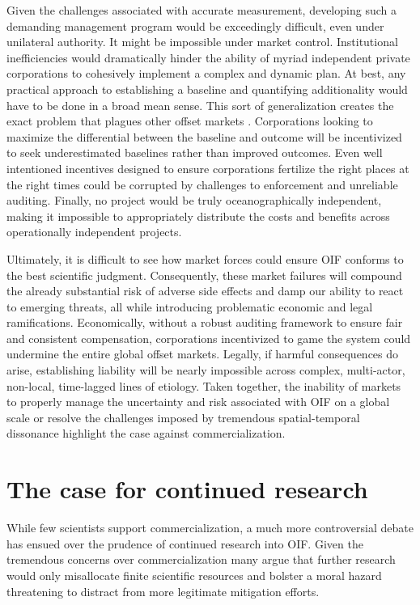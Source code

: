 Given the challenges associated with accurate measurement, developing such a demanding management program would be exceedingly difficult, even under unilateral authority. It might be impossible under market control. Institutional inefficiencies would dramatically hinder the ability of myriad independent private corporations to cohesively implement a complex and dynamic plan. At best, any practical approach to establishing a baseline and quantifying additionality would have to be done in a broad mean sense. This sort of generalization creates the exact problem that plagues other offset markets \parencite{GillenwaterWhatadditionalityPart2012}. Corporations looking to maximize the differential between the baseline and outcome will be incentivized to seek underestimated baselines rather than improved outcomes. Even well intentioned incentives designed to ensure corporations fertilize the right places at the right times could be corrupted by challenges to enforcement and unreliable auditing. Finally, no project would be truly oceanographically independent, making it impossible to appropriately distribute the costs and benefits across operationally independent projects.

Ultimately, it is difficult to see how market forces could ensure OIF conforms to the best scientific judgment. Consequently, these market failures will compound the already substantial risk of adverse side effects and damp our ability to react to emerging threats, all while introducing problematic economic and legal ramifications. Economically, without a robust auditing framework to ensure fair and consistent compensation, corporations incentivized to game the system could undermine the entire global offset markets. Legally, if harmful consequences do arise, establishing liability will be nearly impossible across complex, multi-actor, non-local, time-lagged lines of etiology. 
Taken together, the inability of markets to properly manage the uncertainty and risk associated with OIF on a global scale or resolve the challenges imposed by tremendous spatial-temporal dissonance highlight the case against commercialization.

\section{The case for continued research}

While few scientists support commercialization, a much more controversial debate has ensued over the prudence of continued research into OIF. Given the tremendous concerns over commercialization many argue that further research would only misallocate finite scientific resources and bolster a moral hazard threatening to distract from more legitimate mitigation efforts. 


